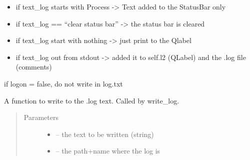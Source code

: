 \documentclass[letterpaper,10pt,english]{sphinxmanual}
\begin{document}
\begin{fulllineitems}
\begin{fulllineitems}
\begin{itemize}
\item {} 
if text\_log starts with Process -\textgreater{} Text added to the StatusBar only

\item {} 
if text\_log == ``clear status bar'' -\textgreater{} the status bar is cleared

\item {} 
if text\_log start with nothing -\textgreater{} just print to the Qlabel

\item {} 
if text\_log out from stdout -\textgreater{} added it to self.l2 (QLabel) and the .log file (comments)

\end{itemize}

if logon = false, do not write in log.txt

\end{fulllineitems}


\begin{fulllineitems}
\label{\detokenize{index:src_GUI.Main_windows_1.CentralW.write_log_file}}
A function to write to the .log text. Called by write\_log.
\begin{quote}\begin{description}
\item[{Parameters}] \leavevmode\begin{itemize}
\item {} 
 -- the text to be written (string)

\item {} 
 -- the path+name where the log is

\end{itemize}

\end{description}\end{quote}

\end{fulllineitems}


\end{fulllineitems}

\end{document}
